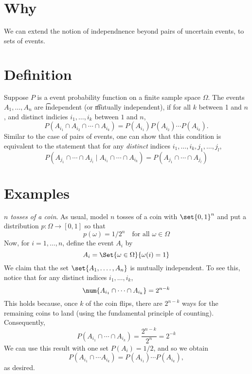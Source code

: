 
\section*{Why}

We can extend the notion of independnence beyond pairs of uncertain events, to sets of events.

\section*{Definition}

Suppose $P$ is a event probability function on a finite sample space $\Omega $.
The events $A_1, \dots , A_n$ are \t{independent} (or \t{mutually independent}), if for all $k$ between 1 and $n$, and distinct indicies $i_1, \dots , i_k$ between $1$ and $n$,
\[
P(A_{i_1} \cap  A_{i_2} \cap  \cdots \cap  A_{i_k})
=
P(A_{i_1}) P(A_{i_2}) \cdots P(A_{i_k}) .
\]
Similar to the case of pairs of events, one can show that this condition is equivalent to the statement that for any \textit{distinct} indices $i_1, \dots , i_k, j_1, \dots , j_l$,
\[
P(A_{j_1} \cap  \cdots \cap  A_{j_l} \mid  A_{i_1} \cap  \cdots \cap  A_{i_k}) = P(A_{j_1} \cap  \cdots \cap  A_{j_l})
\]

\section*{Examples}

\textit{$n$ tosses of a coin}.
As usual, model $n$ tosses of a coin with $\set{0,1}^n$ and put a distribution $p: \Omega  \to [0,1]$ so that
\[
p(\omega ) = 1/2^n \quad \text{for all } \omega  \in \Omega
\]
Now, for $i = 1, \dots , n$, define the event $A_i$ by
\[
A_i = \Set{\omega  \in \Omega }{\omega (i) = 1}
\]
We claim that the set $\set{A_1,. \dots , A_n}$ is mutually independent.
To see this, notice that for any distinct indices $i_1, \dots , i_k$,
\[
\num{A_{i_1} \cap  \cdots \cap  A_{i_k}} = 2^{n-k}
\]
This holds because, once $k$ of the coin flips, there are $2^{n-k}$ ways for the remaining coins to land (using the fundamental principle of counting).
Consequently,
\[
P(A_{i_1} \cap  \cdots \cap  A_{i_k}) = \frac{2^{n-k}}{2^n} = 2^{-k}
\]
We can use this result with one set $P(A_i) = 1/2$, and so we obtain
\[
P(A_{i_1} \cap  \cdots A_{i_k}) = P(A_{i_1}) \cdots P(A_{i_k}),
\]
as desired.

\blankpage